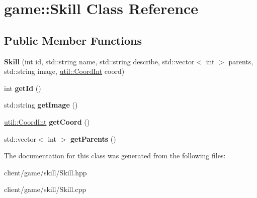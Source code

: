 \hypertarget{classgame_1_1_skill}{\section{game\-:\-:Skill Class Reference}
\label{classgame_1_1_skill}
}
\subsection*{Public Member Functions}
\begin{DoxyCompactItemize}
\item 
\hypertarget{classgame_1_1_skill_a98b1966c50537ed7eb7b139a47574706}{{\bfseries Skill} (int id, std\-::string name, std\-::string describe, std\-::vector$<$ int $>$ parents, std\-::string image, \hyperlink{classutil_1_1_coordinates}{util\-::\-Coord\-Int} coord)}\label{classgame_1_1_skill_a98b1966c50537ed7eb7b139a47574706}

\item 
\hypertarget{classgame_1_1_skill_ab9328586287e9b2e7cc4ce8dea01a566}{int {\bfseries get\-Id} ()}\label{classgame_1_1_skill_ab9328586287e9b2e7cc4ce8dea01a566}

\item 
\hypertarget{classgame_1_1_skill_ab0d5ead75cbe69ff996b80c6bdfb2b76}{std\-::string {\bfseries get\-Image} ()}\label{classgame_1_1_skill_ab0d5ead75cbe69ff996b80c6bdfb2b76}

\item 
\hypertarget{classgame_1_1_skill_a5e97c34bd5243ead8a2d059968be82c8}{\hyperlink{classutil_1_1_coordinates}{util\-::\-Coord\-Int} {\bfseries get\-Coord} ()}\label{classgame_1_1_skill_a5e97c34bd5243ead8a2d059968be82c8}

\item 
\hypertarget{classgame_1_1_skill_a6c2b2191dd676a3a401f7f65872dd23a}{std\-::vector$<$ int $>$ {\bfseries get\-Parents} ()}\label{classgame_1_1_skill_a6c2b2191dd676a3a401f7f65872dd23a}

\end{DoxyCompactItemize}


The documentation for this class was generated from the following files\-:\begin{DoxyCompactItemize}
\item 
client/game/skill/Skill.\-hpp\item 
client/game/skill/Skill.\-cpp\end{DoxyCompactItemize}
